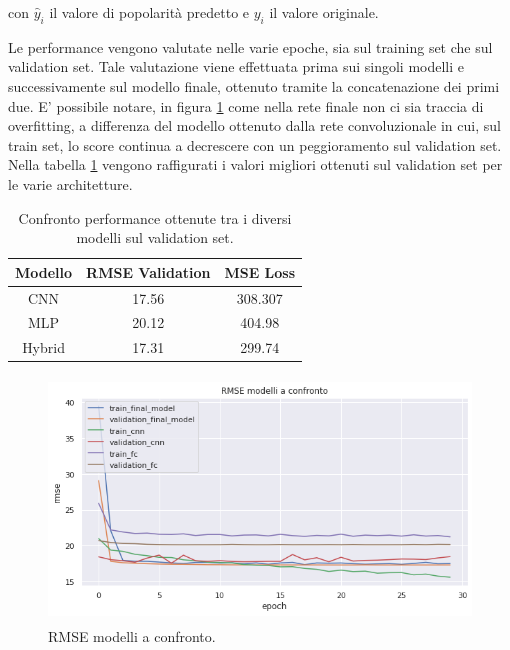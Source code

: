con $\hat{y}_i$ il valore di popolarità predetto e $y_i$ il valore originale.


Le performance vengono valutate nelle varie epoche, sia sul training set che sul validation set. Tale valutazione viene effettuata prima sui singoli modelli e successivamente sul modello finale, ottenuto tramite la concatenazione dei primi due. E' possibile notare, in figura \ref{fig:rmse-all} come nella rete finale non ci sia traccia di overfitting, a differenza del modello ottenuto dalla rete convoluzionale in cui, sul train set, lo score continua a decrescere con un peggioramento sul validation set. 
Nella tabella \ref{table:rmse} vengono raffigurati i valori migliori ottenuti sul validation set per le varie architetture.

\begin{table}[H]
\caption{Confronto performance ottenute tra i diversi modelli sul validation set.}
  \vspace{3mm}
\centering
\begin{tabular}{|c|c|c|}
\hline
\textbf{Modello} & \textbf{RMSE Validation} & \textbf{MSE Loss} \\ \hline \hline
CNN     & 17.56           & 308.307  \\ \hline 
MLP     & 20.12           & 404.98   \\ \hline 
Hybrid  & 17.31           & 299.74   \\ \hline
\end{tabular}
\label{table:rmse}
\end{table}

\vspace{1cm}

\begin{figure}[h]
    \centering
    \includegraphics[width=13cm, height=6.5cm]{Plot/ALL_RMSE.png}
    \caption{RMSE modelli a confronto.}
    \label{fig:rmse-all}
\end{figure}


